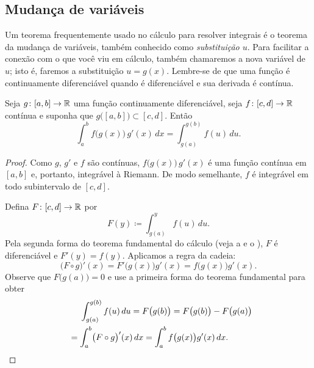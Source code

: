 \subsection{Mudança de variáveis}

Um teorema frequentemente usado no cálculo para resolver integrais é o
teorema da mudança de variáveis, também conhecido como
\emph{substituição $u$}.
Para facilitar a conexão com o que você viu em cálculo, também chamaremos
a nova variável de $u$; isto é, faremos a substituição $u=g(x)$.
Lembre-se de que uma função é continuamente diferenciável quando
é diferenciável e sua derivada é contínua.

\begin{thm}
Seja $g \colon [a,b] \to {\mathbb{R}}$ uma função continuamente diferenciável,
seja $f \colon [c,d] \to {\mathbb{R}}$ contínua e suponha que
$g\bigl([a,b]\bigr) \subset [c,d]$. Então
\begin{equation*}
\int_a^b f\bigl(g(x)\bigr)\, g'(x)\, dx =
\int_{g(a)}^{g(b)} f(u)\, du .
\end{equation*}
\end{thm}

\begin{proof}
Como $g$, $g'$ e $f$ são contínuas, $f\bigl(g(x)\bigr)\,g'(x)$
é uma função contínua em $[a,b]$ e, portanto, integrável à Riemann.
De modo semelhante, $f$ é integrável em todo subintervalo de $[c,d]$.

Defina $F \colon [c,d] \to {\mathbb{R}}$ por
\begin{equation*}
F(y) \coloneqq \int_{g(a)}^{y} f(u)\,du .
\end{equation*}
Pela segunda forma do teorema fundamental do cálculo
(veja a  e o ),
$F$ é diferenciável e $F'(y) = f(y)$. Aplicamos a regra da cadeia:
\begin{equation*}
\bigl( F \circ g \bigr)' (x) =
F'\bigl(g(x)\bigr) g'(x)
=
f\bigl(g(x)\bigr) g'(x) .
\end{equation*}
Observe que $F\bigl(g(a)\bigr) = 0$ e use a primeira forma do teorema
fundamental para obter
\begin{multline*}
\qquad %
\int_{g(a)}^{g(b)} f(u)\,du = F\bigl(g(b)\bigr) = F\bigl(g(b)\bigr)-F\bigl(g(a)\bigr)
\\
=
\int_a^b 
\bigl( F \circ g \bigr)' (x) \,dx
=
\int_a^b 
f\bigl(g(x)\bigr) g'(x)
\,dx .
\qquad %
\qedhere
\end{multline*}
\end{proof}

